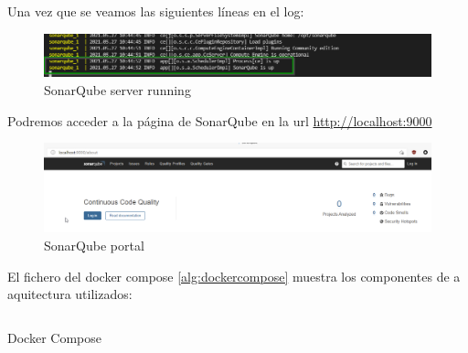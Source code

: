 \clearpage
\newpage
Una vez que se veamos las siguientes líneas en el log:\\
\begin{figure}[!htb] 
    \captionsetup{width=1\linewidth}   
    \includegraphics[width=\linewidth]{./imagenes/05_SonarQubeServerRunning.png}
    \caption{SonarQube server running}  
\end{figure}

Podremos acceder a la página de SonarQube en 
la url \href{http://localhost:9000}{http://localhost:9000}\\
\begin{figure}[!htb] 
    \captionsetup{width=1\linewidth}   
    \includegraphics[width=\linewidth]{./imagenes/06_SonarQubeServer_Webpage.png}
    \caption{SonarQube portal}  
    \label{fig:21}
\end{figure}

\clearpage
\newpage
El fichero del docker compose \ref{alg:dockercompose} muestra los componentes de a aquitectura utilizados:

\begin{listing}
    \centering
    \inputminted{yaml}{./EntornoPruebas/SonarQube_8.2/docker-compose.yml}
    \caption{Docker Compose}
    \label{alg:dockercompose}
\end{listing}

\clearpage